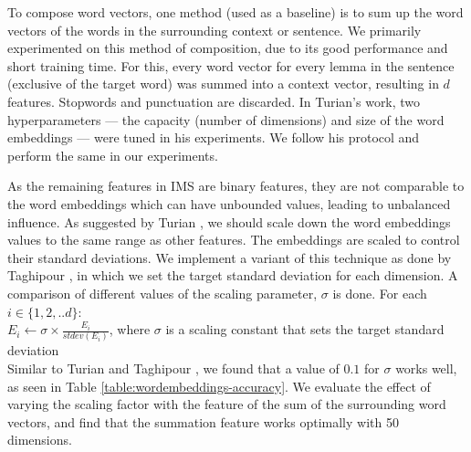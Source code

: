 To compose word vectors, one method (used as a baseline) is to sum up
the word vectors of the words in the surrounding context or
sentence. We primarily experimented on this method of composition, due
to its good performance and short training time. For this, every word
vector for every lemma in the sentence (exclusive of the target word)
was summed into a context vector, resulting in $d$ features. Stopwords
and punctuation are discarded. In Turian's
 work, two hyperparameters ---
the capacity (number of dimensions) and size of the word embeddings
--- were tuned in his experiments. We follow his protocol and perform
the same in our experiments.

As the remaining features in IMS are binary features, they are not
comparable to the word embeddings which can have unbounded values,
leading to unbalanced influence. As suggested by Turian
, we should scale down the word
embeddings values to the same range as other features. The embeddings are scaled to control their standard
deviations. We implement a variant of this technique as done by
Taghipour , in which we set the target standard
deviation for each dimension. A comparison of different values of the
scaling parameter, $\sigma$ is done. For each $i \in \{1, 2, .. d\}$:
\\

$E_{i} \leftarrow \sigma \times \frac{E_{i}}{stdev(E_{i})} $, where
$\sigma$ is a scaling constant that sets the target standard deviation
\\

Similar to Turian 
and Taghipour , we found that a value of $0.1$
for $\sigma$ works well, as seen in Table
\ref{table:wordembeddings-accuracy}. 
We evaluate the effect of varying the scaling factor with the feature
of the sum of the surrounding word vectors, and find that the
summation feature works optimally with 50 dimensions.

